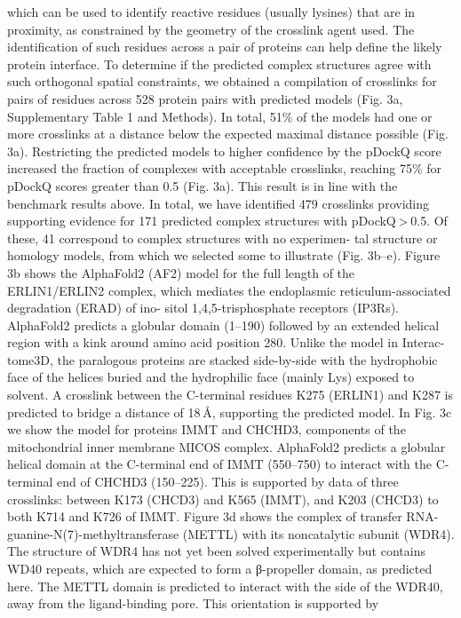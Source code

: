 which can be used to identify reactive residues (usually lysines) that
are in proximity, as constrained by the geometry of the crosslink agent
used. The identification of such residues across a pair of proteins can
help define the likely protein interface. To determine if the predicted
complex structures agree with such orthogonal spatial constraints, we
obtained a compilation of crosslinks for pairs of residues across 528
protein pairs with predicted models (Fig. 3a, Supplementary Table 1
and Methods). In total, 51\% of the models had one or more crosslinks
at a distance below the expected maximal distance possible (Fig. 3a).
Restricting the predicted models to higher confidence by the pDockQ
score increased the fraction of complexes with acceptable crosslinks,
reaching 75\% for pDockQ scores greater than 0.5 (Fig. 3a). This result
is in line with the benchmark results above.
In total, we have identified 479 crosslinks providing supporting
evidence for 171 predicted complex structures with pDockQ > 0.5.
Of these, 41 correspond to complex structures with no experimen-
tal structure or homology models, from which we selected some to
illustrate (Fig. 3b–e). Figure 3b shows the AlphaFold2 (AF2) model
for the full length of the ERLIN1/ERLIN2 complex, which mediates
the endoplasmic reticulum-associated degradation (ERAD) of ino-
sitol 1,4,5-trisphosphate receptors (IP3Rs). AlphaFold2 predicts a
globular domain (1–190) followed by an extended helical region with
a kink around amino acid position 280. Unlike the model in Interac-
tome3D, the paralogous proteins are stacked side-by-side with the
hydrophobic face of the helices buried and the hydrophilic face
(mainly Lys) exposed to solvent. A crosslink between the C-terminal
residues K275 (ERLIN1) and K287 is predicted to bridge a distance of
18 Å, supporting the predicted model. In Fig. 3c we show the model
for proteins IMMT and CHCHD3, components of the mitochondrial
inner membrane MICOS complex. AlphaFold2 predicts a globular
helical domain at the C-terminal end of IMMT (550–750) to interact
with the C-terminal end of CHCHD3 (150–225). This is supported by
data of three crosslinks: between K173 (CHCD3) and K565 (IMMT), and
K203 (CHCD3) to both K714 and K726 of IMMT. Figure 3d shows the
complex of transfer RNA-guanine-N(7)-methyltransferase (METTL)
with its noncatalytic subunit (WDR4). The structure of WDR4 has not
yet been solved experimentally but contains WD40 repeats, which
are expected to form a β-propeller domain, as predicted here. The
METTL domain is predicted to interact with the side of the WDR40,
away from the ligand-binding pore. This orientation is supported by
